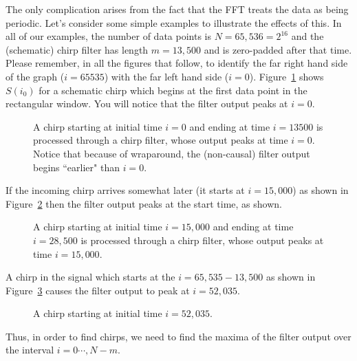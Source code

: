 The only complication arises from the fact that the FFT treats the data
as being periodic.  Let's consider some simple examples to illustrate
the effects of this.   In all of our examples, the number of data
points is $N=65,536=2^{16}$ and the (schematic) chirp filter has length
$m=13,500$ and is zero-padded after that time.   Please remember, in
all the figures that follow, to identify the far right hand side of the
graph ($i=65535$) with the far left hand side ($i=0$).
Figure~\ref{f:chirpa} shows $S(i_0)$ for a schematic chirp which begins
at the first data point in the rectangular window.  You will notice
that the filter output peaks at $i=0$.
\begin{figure}[h]
\begin{center}
\caption{ \label{f:chirpa} A chirp starting at initial time $i=0$ and
ending at time $i=13500$ is processed through a chirp filter, whose
output peaks at time $i=0$.  Notice that because of wraparound, the
(non-causal) filter output begins ``earlier" than $i=0$.}
\end{center}
\end{figure}
If the incoming chirp arrives somewhat later (it starts at $i=15,000$)
as shown in Figure~\ref{f:chirpb} then the filter output peaks at the
start time, as shown.
\begin{figure}[h]
\begin{center}
\caption{ \label{f:chirpb} A chirp starting at initial time $i=15,000$ and
ending at time $i=28,500$ is processed through a chirp filter, whose
output peaks at time $i=15,000$.}
\end{center}
\end{figure}
A chirp in the signal which starts at the $i=65,535-13,500$ as shown in
Figure~\ref{f:chirpc} causes the filter output to peak at $i=52,035$.
\begin{figure}[h]
\begin{center}
\caption{ \label{f:chirpc} A chirp starting at initial time $i=52,035$.}
\end{center}
\end{figure}
Thus, in order to find chirps, we need to find the maxima of the filter
output over the interval $i=0\cdots,N-m$.

